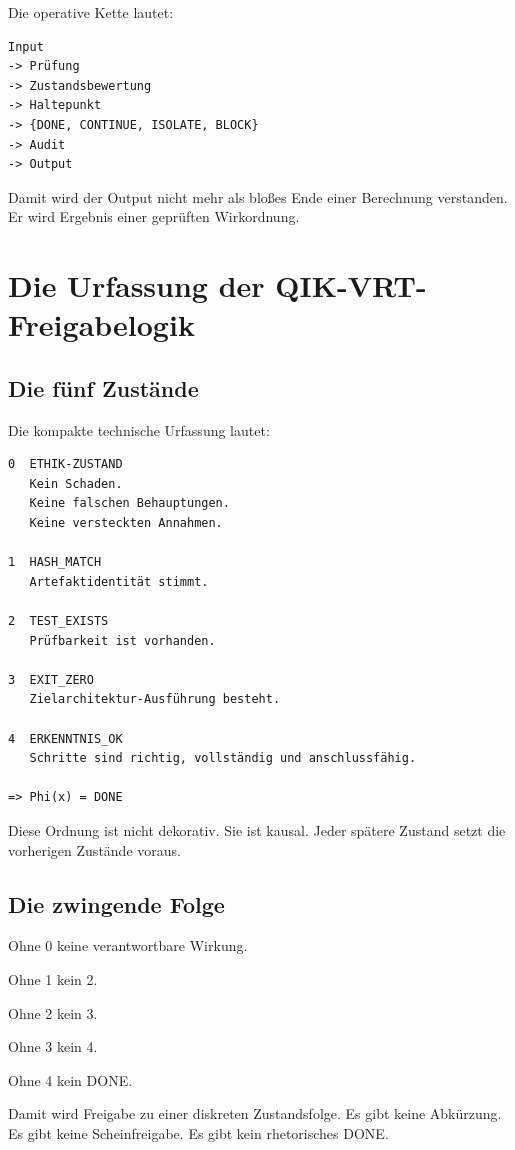 \documentclass[11pt,a4paper,oneside]{book}
\begin{document}
Die operative Kette lautet:

\begin{lstlisting}
Input
-> Prüfung
-> Zustandsbewertung
-> Haltepunkt
-> {DONE, CONTINUE, ISOLATE, BLOCK}
-> Audit
-> Output
\end{lstlisting}

Damit wird der Output nicht mehr als bloßes Ende einer Berechnung verstanden. Er wird Ergebnis einer geprüften Wirkordnung.

\chapter{Die Urfassung der QIK-VRT-Freigabelogik}

\section{Die fünf Zustände}

Die kompakte technische Urfassung lautet:

\begin{lstlisting}
0  ETHIK-ZUSTAND
   Kein Schaden.
   Keine falschen Behauptungen.
   Keine versteckten Annahmen.

1  HASH_MATCH
   Artefaktidentität stimmt.

2  TEST_EXISTS
   Prüfbarkeit ist vorhanden.

3  EXIT_ZERO
   Zielarchitektur-Ausführung besteht.

4  ERKENNTNIS_OK
   Schritte sind richtig, vollständig und anschlussfähig.

=> Phi(x) = DONE
\end{lstlisting}

Diese Ordnung ist nicht dekorativ. Sie ist kausal. Jeder spätere Zustand setzt die vorherigen Zustände voraus.

\section{Die zwingende Folge}

\begin{merkbox}
Ohne 0 keine verantwortbare Wirkung.\par
Ohne 1 kein 2.\par
Ohne 2 kein 3.\par
Ohne 3 kein 4.\par
Ohne 4 kein DONE.
\end{merkbox}

Damit wird Freigabe zu einer diskreten Zustandsfolge. Es gibt keine Abkürzung. Es gibt keine Scheinfreigabe. Es gibt kein rhetorisches DONE.
\end{document}

